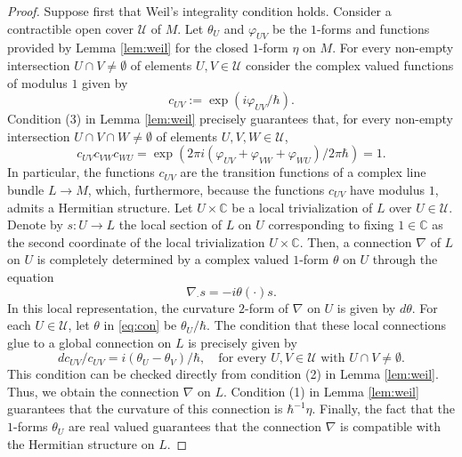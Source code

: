 \documentclass{amsart}
\theoremstyle{definition}
\theoremstyle{remark}
\numberwithin{equation}{section}
\newcommand{\<}{{\langle}}
\renewcommand{\>}{{\rangle}}
\begin{document}
\begin{proof}
    Suppose first that Weil's integrality condition holds. Consider a contractible open cover $\mathcal{U}$ of $M$. Let $\theta_U$ and $\varphi_{UV}$ be the $1$-forms and functions provided by Lemma \ref{lem:weil} for the closed $1$-form $\eta$ on $M$. For every non-empty intersection $U \cap V \neq \emptyset$ of elements $U,V \in \mathcal{U}$ consider the complex valued functions of modulus $1$ given by
    \[
    c_{UV} := \exp(i\varphi_{UV}/\hbar).
    \]
    Condition (3) in Lemma \ref{lem:weil} precisely guarantees that, for every non-empty intersection $U\cap V\cap W \neq \emptyset$ of elements $U,V,W \in \mathcal{U}$,
    \[
    c_{UV} c_{VW} c_{WU} = \exp(2\pi i (\varphi_{UV} + \varphi_{VW} + \varphi_{WU})/2\pi\hbar) = 1.
    \]
    In particular, the functions $c_{UV}$ are the transition functions of a complex line bundle $L \to M$, which, furthermore, because the functions $c_{UV}$ have modulus $1$, admits a Hermitian structure. Let $U \times \mathbb{C}$ be a local trivialization of $L$ over $U \in \mathcal{U}$. Denote by $s \colon U \to L$ the local section of $L$ on $U$ corresponding to fixing $1 \in \mathbb{C}$ as the second coordinate of the local trivialization $U \times \mathbb{C}$. Then, a connection $\nabla$ of $L$ on $U$ is completely determined by a complex valued $1$-form $\theta$ on $U$ through the equation
    \begin{equation}
    \label{eq:con}
    \nabla_\cdot s = -i \theta(\cdot) s.
    \end{equation}
    In this local representation, the curvature $2$-form of $\nabla$ on $U$ is given by $d\theta$. For each $U \in \mathcal{U}$, let $\theta$ in \eqref{eq:con} be $\theta_U/\hbar$. The condition that these local connections glue to a global connection on $L$ is precisely given by
    \begin{equation}
    \label{eq:glue}
    dc_{UV}/c_{UV} = i(\theta_U - \theta_V)/\hbar, \quad \text{for every } U,V \in \mathcal{U} \text{ with } U\cap V \neq\emptyset.
    \end{equation}
    This condition can be checked directly from condition (2) in Lemma \ref{lem:weil}. Thus, we obtain the connection $\nabla$ on $L$. Condition (1) in Lemma \ref{lem:weil} guarantees that the curvature of this connection is $\hbar^{-1} \eta$. Finally, the fact that the $1$-forms $\theta_U$ are real valued guarantees that the connection $\nabla$ is compatible with the Hermitian structure on $L$.  


\end{proof}
\end{document}
